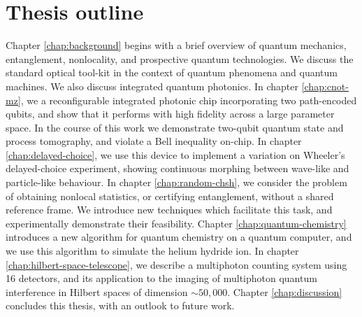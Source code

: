 \section{Thesis outline}
Chapter \ref{chap:background} begins with a brief overview of quantum mechanics, entanglement, nonlocality, and prospective quantum technologies. We discuss the standard optical tool-kit in the context of quantum phenomena and quantum machines. We also discuss integrated quantum photonics. In chapter \ref{chap:cnot-mz}, we a reconfigurable integrated photonic chip incorporating two path-encoded qubits, and show that it performs with high fidelity across a large parameter space. In the course of this work we demonstrate two-qubit quantum state and process tomography, and violate a Bell inequality on-chip.  In chapter \ref{chap:delayed-choice}, we use this device to implement a variation on Wheeler's delayed-choice experiment, showing continuous morphing between wave-like and particle-like behaviour.  In chapter \ref{chap:random-chsh}, we consider the problem of obtaining nonlocal statistics, or certifying entanglement, without a shared reference frame. We introduce new techniques which facilitate this task, and experimentally demonstrate their feasibility. Chapter \ref{chap:quantum-chemistry} introduces a new algorithm for quantum chemistry on a quantum computer, and we use this algorithm to simulate the helium hydride ion. In chapter \ref{chap:hilbert-space-telescope}, we describe a multiphoton counting system using 16 detectors, and its application to the imaging of multiphoton quantum interference in Hilbert spaces of dimension $\sim50,000$. Chapter \ref{chap:discussion} concludes this thesis, with an outlook to future work.

%
%
